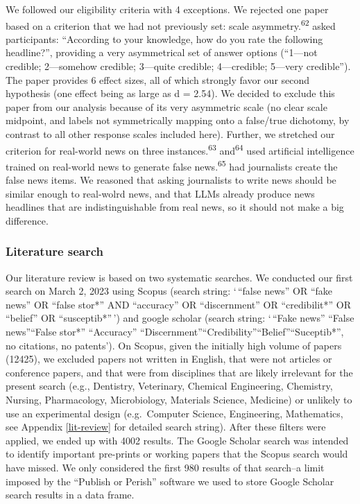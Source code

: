 \documentclass[
  man]{apa6}
\begin{document}
We followed our eligibility criteria with 4 exceptions. We rejected one paper based on a criterion that we had not previously set: scale asymmetry.\textsuperscript{62} asked participants: ``According to your knowledge, how do you rate the following headline?'', providing a very asymmetrical set of answer options (``1---not credible; 2---somehow credible; 3---quite credible; 4---credible; 5---very credible''). The paper provides 6 effect sizes, all of which strongly favor our second hypothesis (one effect being as large as d = 2.54). We decided to exclude this paper from our analysis because of its very asymmetric scale (no clear scale midpoint, and labels not symmetrically mapping onto a false/true dichotomy, by contrast to all other response scales included here). Further, we stretched our criterion for real-world news on three instances.\textsuperscript{63} and\textsuperscript{64} used artificial intelligence trained on real-world news to generate false news.\textsuperscript{65} had journalists create the false news items. We reasoned that asking journalists to write news should be similar enough to real-wolrd news, and that LLMs already produce news headlines that are indistinguishable from real news, so it should not make a big difference.

\subsubsection{Literature search}\label{literature-search}

Our literature review is based on two systematic searches. We conducted our first search on March 2, 2023 using Scopus (search string: `\,``false news'' OR ``fake news'' OR ``false stor*'' AND ``accuracy'' OR ``discernment'' OR ``credibilit*'' OR ``belief'' OR ``susceptib*''\,') and google scholar (search string: `\,``Fake news'' \textbar{} ``False news''\textbar{}``False stor*'' ``Accuracy'' \textbar{} ``Discernment''\textbar{}``Credibility''\textbar{}``Belief''\textbar{}``Suceptib*'', no citations, no patents'). On Scopus, given the initially high volume of papers (12425), we excluded papers not written in English, that were not articles or conference papers, and that were from disciplines that are likely irrelevant for the present search (e.g., Dentistry, Veterinary, Chemical Engineering, Chemistry, Nursing, Pharmacology, Microbiology, Materials Science, Medicine) or unlikely to use an experimental design (e.g.~Computer Science, Engineering, Mathematics, see Appendix \ref{lit-review} for detailed search string). After these filters were applied, we ended up with 4002 results. The Google Scholar search was intended to identify important pre-prints or working papers that the Scopus search would have missed. We only considered the first 980 results of that search--a limit imposed by the ``Publish or Perish'' software we used to store Google Scholar search results in a data frame.
\end{document}
